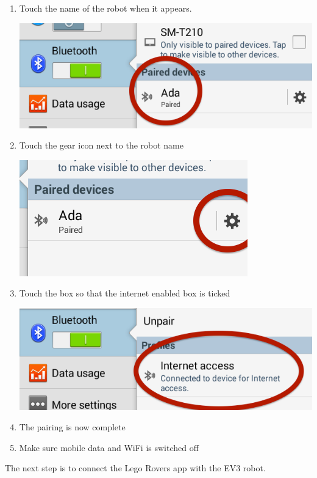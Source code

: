 \documentclass[]{article}   	%
\begin{document}
{\begin{enumerate}
\begin{center}
		\end{center}			
	\item Touch the name of the robot when it appears.\\
		\begin{center}
			\includegraphics[scale=0.4]{btada.png}
		\end{center}			
	\item Touch the gear icon next to the robot name\\
		\begin{center}
			\includegraphics[scale=0.4]{btset.png}
		\end{center}		
\clearpage	
	\item Touch the box so that the internet enabled box is ticked\\
		\begin{center}
			\includegraphics[scale=0.4]{btinternet.png}
		\end{center}		
	\item The pairing is now complete
	\item Make sure mobile data and WiFi is switched off
\end{enumerate}
\par{The next step is to connect the Lego Rovers app with the EV3 robot.}

}
\end{document}
